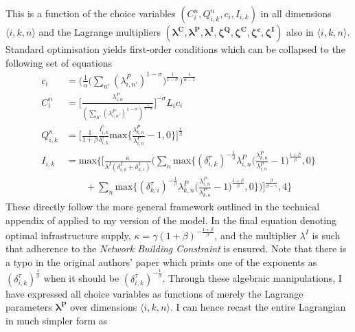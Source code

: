 \documentclass[11pt, oneside]{article}   	%
\begin{document}
\begin{spacing}{1.3}
This is a function of the choice variables $(C_{i}^{n}, Q_{i,k}^{n}, c_{i}, I_{i,k})$ in all dimensions $\langle i,k,n \rangle$ and the Lagrange multipliers $(\bm{\lambda^{C}}, \bm{\lambda^{P}}, \bm{\lambda^{I}}, \bm{\zeta^{Q}}, \bm{\zeta^{C}}, \bm{\zeta^{c}}, \bm{\zeta^{I}})$ also in $\langle i,k,n \rangle$. Standard optimisation yields first-order conditions which can be collapsed to the following set of equations
\begin{equation}
    \label{eq:foc}
  \begin{aligned}
    c_{i} & = \bigg( \frac{1}{\alpha} \Big( \sum_{n'}^{} (\lambda^{P}_{i,n'})^{1-\sigma}\Big)^{\frac{1}{1-\sigma}}\bigg)^{\frac{1}{\alpha-1}} \\
    C_{i}^{n} & = \Bigg[ \frac{\lambda^{P}_{i,n}}{(\sum_{n'}^{} (\lambda^{P}_{i,n'})^{1-\sigma})^{\frac{1}{1-\sigma}}} \Bigg]^{-\sigma}L_{i}c_{i} \\
    Q_{i,k}^{n} & = \Bigg[\frac{1}{1+\beta} \frac{I_{i,k}^{\gamma}}{\delta_{i,k}^{\tau}} \textrm{max}\Big\{\frac{\lambda^{P}_{k,n}}{\lambda^{P}_{i,n}}-1,0\Big\}\Bigg]^{\frac{1}{\beta}} \\
    I_{i,k} & = \textrm{max}\Bigg\{\Bigg[ \frac{\kappa}{\lambda^{I}(\delta^{I}_{i,k} + \delta^{I}_{k,i})} \bigg( \sum_{n}^{} \textrm{max}\Big\{ (\delta^{\tau}_{i,k})^{-\frac{1}{\beta}} \lambda^{P}_{i,n} \Big( \frac{\lambda^{P}_{k,n}}{\lambda^{P}_{i,n}}-1 \Big)^{\frac{1+\beta}{\beta}} , 0\Big\} \\
    & \qquad + \sum_{n}^{} \textrm{max}\Big\{ (\delta^{\tau}_{k,i})^{-\frac{1}{\beta}} \lambda^{P}_{k,n} \Big( \frac{\lambda^{P}_{i,n}}{\lambda^{P}_{k,n}}-1 \Big)^{\frac{1+\beta}{\beta}} , 0\Big\} \bigg) \Bigg]^{\frac{\beta}{\beta-\gamma}}, 4\Bigg\}
  \end{aligned}
\end{equation}
These directly follow the more general framework outlined in the technical appendix of \citeauthor{Fajgelbaum_OptimalTransportNetworks_2017} applied to my version of the model. In the final equation denoting optimal infrastructure supply, $\kappa = \gamma(1+\beta)^{-\frac{1+\beta}{\beta}}$, and the multiplier $\lambda^{I}$ is such that adherence to the \emph{Network Building Constraint} is ensured. Note that there is a typo in the original authors' paper which prints one of the exponents as $(\delta^{\tau}_{i,k})^{\frac{1}{\beta}}$ when it should be $(\delta^{\tau}_{i,k})^{-\frac{1}{\beta}}$. Through these algebraic manipulations, I have expressed all choice variables as functions of merely the Lagrange parameters $\bm{\lambda^{P}}$ over dimensions $\langle i,k,n \rangle$. I can hence recast the entire Lagrangian in much simpler form as

\end{spacing}
\end{document}

